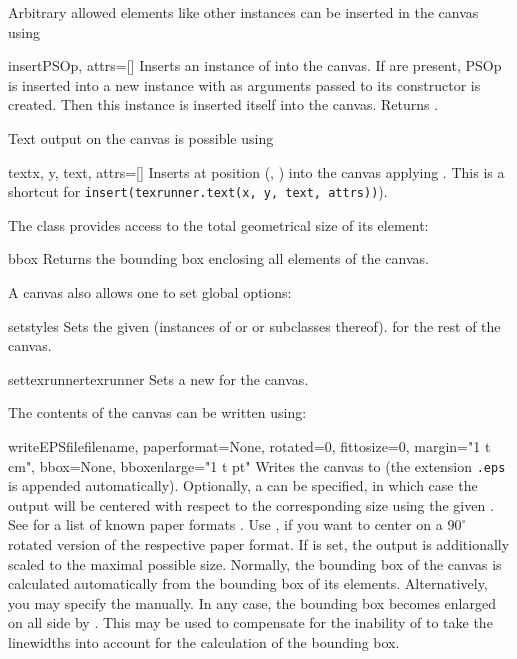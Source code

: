Arbitrary allowed elements like other  instances can
be inserted in the canvas using

\begin{methoddesc}{insert}{PSOp, attrs=[]}
  Inserts an instance of  into the canvas.  If
   are present, PSOp is inserted into a new
  instance with  as arguments passed to its
  constructor is created. Then this  instance is
  inserted itself into the canvas. Returns .
\end{methoddesc}

Text output on the canvas is possible using

\begin{methoddesc}{text}{x, y, text, attrs=[]}
  Inserts  at position (, ) into the
  canvas applying . This is a shortcut for
  \texttt{insert(texrunner.text(x, y, text, attrs))}).
\end{methoddesc}

The  class provides access to the total geometrical size
of its element:

\begin{methoddesc}{bbox}{}
  Returns the bounding box enclosing all elements of the canvas.
\end{methoddesc}

A canvas also allows one to set global options:

\begin{methoddesc}{set}{styles}
  Sets the given  (instances of  or
   or subclasses thereof).  for the rest of
  the canvas.
\end{methoddesc}

\begin{methoddesc}{settexrunner}{texrunner}
  Sets a new  for the canvas.
\end{methoddesc}

The contents of the canvas can be written using:

\begin{methoddesc}{writeEPSfile}{filename, paperformat=None,
    rotated=0, fittosize=0, margin="1 t cm", bbox=None, bboxenlarge="1
    t pt"} 
  Writes the canvas to  (the extension \texttt{.eps} is
  appended automatically). Optionally, a  can be
  specified, in which case the output will be centered with respect to
  the corresponding size using the given . See
   for a list of known paper formats .  Use
  , if you want to center on a $90^\circ$ rotated version
  of the respective paper format. If  is set, the
  output is additionally scaled to the maximal possible size.
  Normally, the bounding box of the canvas is calculated automatically
  from the bounding box of its elements.  Alternatively, you may
  specify the  manually. In any case, the bounding box
  becomes enlarged on all side by . This may be used
  to compensate for the inability of \PyX{} to take the linewidths
  into account for the calculation of the bounding box.
\end{methoddesc}

